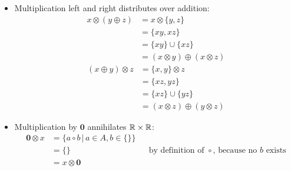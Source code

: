 \documentclass[a4paper,12pt]{ETHexercise}
\begin{document}
\begin{question}
\begin{subquestion}
\begin{itemize}
			\item Multiplication left and right distributes over addition:
			      \begin{align}
				      x \otimes \left( y \oplus z\right) & = x \otimes \{y, z\}                                          \\
				                                         & = \{xy, xz\}                                                  \\
				                                         & = \{xy\} \cup \{xz\}                                          \\
				                                         & = \left( x \otimes y \right) \oplus \left( x \otimes z\right)
			      \end{align}
			      \begin{align}
				      \left(x \oplus y\right) \otimes z & = \{x, y\} \otimes z                                         \\
				                                        & = \{xz, yz\}                                                 \\
				                                        & = \{xz\} \cup \{yz\}                                         \\
				                                        & = \left( x \otimes z\right) \oplus \left( y \otimes z\right)
			      \end{align}
			\item Multiplication by $\mathbf{0}$ annihilates $\mathbb{R} \times \mathbb{R}$:
			      \begin{align}
				      \mathbf{0} \otimes x & = \{a \circ b \,|\, a \in A, b \in \{\}\}                                                             \\
				                           & = \{\}                                    &  & \text{by definition of $\circ$, because no $b$ exists} \\
				                           & = x \otimes \mathbf{0}                                                                                \\
			      \end{align}
		\end{itemize}
	\end{subquestion}
\end{question}
\end{document}
